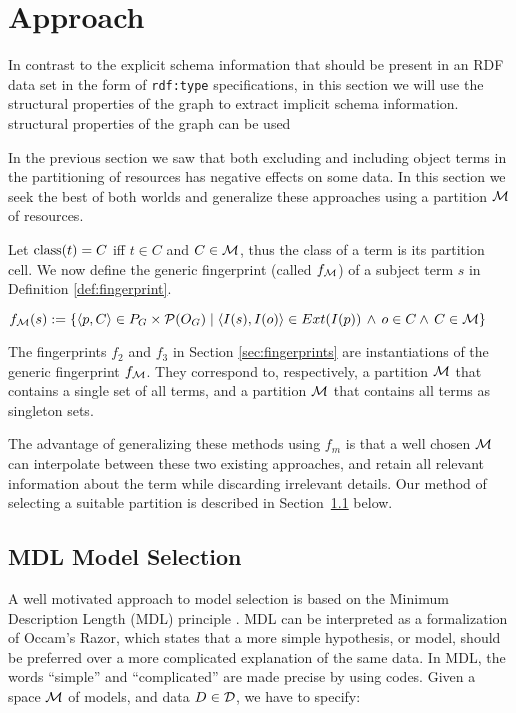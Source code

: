 \section{Approach}
\label{sec:approach}

In contrast to the explicit schema information that should be present
in an RDF data set in the form of \texttt{rdf:type} specifications, in
this section we will use the structural properties of the graph to
extract implicit schema information.
structural properties of the graph can be used

In the previous section we saw that both excluding and including object terms
 in the partitioning of resources has negative effects on some data.
In this section we seek the best of both worlds
 and generalize these approaches using a partition ${\mathcal M}$ of resources.

Let $\textnormal{class}(t) = C$ iff $t \in C$ and $C \in {\mathcal M}$,
 thus the class of a term is its partition cell.
We now define the generic fingerprint (called $f_{\mathcal M}$) of a subject term $s$
 in Definition \ref{def:fingerprint}.

\begin{definition}[Fingerprint]
  \label{def:fingerprint}
  $
    f_{\mathcal M}(s)
  := \\
    \{
      {\left\langle{p,C}\right\rangle} \in P_G \times \mathcal{P}(O_G)
    \mid
      \langle I(s),I(o)\rangle \in Ext(I(p)) \, \wedge \, o \in C \\
      \wedge \, C \in {\mathcal M}
    \}
  $
\end{definition}

The fingerprints $f_2$ and $f_3$ in Section \ref{sec:fingerprints}
 are instantiations of the generic fingerprint $f_{\mathcal M}$.
They correspond to, respectively,
  a partition ${\mathcal M}$ that contains a single set of all terms,
 and
  a partition ${\mathcal M}$ that contains all terms as singleton sets.

The advantage of generalizing these methods using $f_m$ is that
 a well chosen ${\mathcal M}$ can interpolate between these two existing approaches,
 and retain all relevant information about the term while discarding
 irrelevant details.
Our method of selecting a suitable partition is
 described in Section~\ref{sec:mdl} below.

\subsection{MDL Model Selection}
\label{sec:mdl}

A well motivated approach to model selection is based on
 the Minimum Description Length (MDL) principle
 \cite{Rissanen78,Rissanen84,grunwald2007}.
MDL can be interpreted as a formalization of Occam's Razor,
 which states that a more simple hypothesis,
 or model, should be preferred over a more complicated explanation of
 the same data.
In MDL, the words ``simple'' and ``complicated'' are
 made precise by using codes.
Given a space ${\mathcal M}$ of models, and data $D\in{\mathcal D}$,
 we have to specify:

